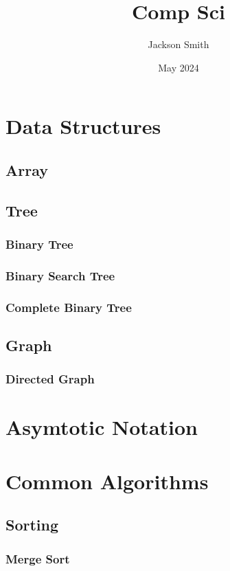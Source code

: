 \documentclass[12pt, letterpaper]{article}
\title{Comp Sci}
\author{Jackson Smith}
\date{May 2024}
\begin{document}
\maketitle

\section{Data Structures}

\subsection{Array}

\subsection{Tree}
\subsubsection{Binary Tree}
\subsubsection{Binary Search Tree}
\subsubsection{Complete Binary Tree}

\subsection{Graph} 
\subsubsection{Directed Graph} 

\section{Asymtotic Notation} 

\section{Common Algorithms}

\subsection{Sorting}

\subsubsection{Merge Sort}
\end{document}
